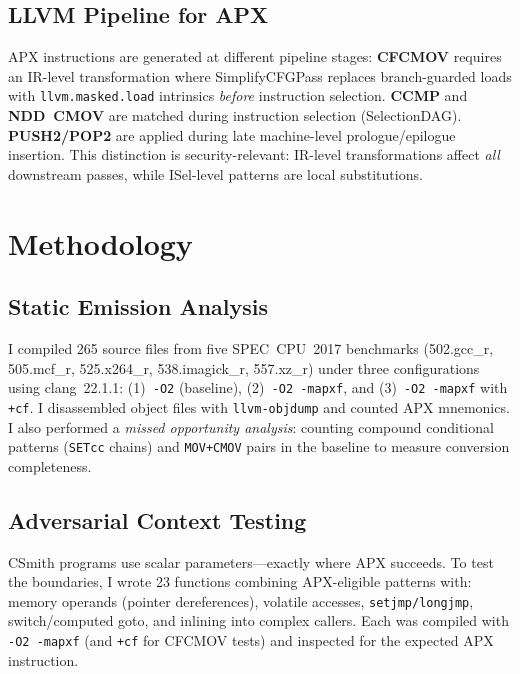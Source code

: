 \documentclass[acmsmall,nonacm]{acmart}
\begin{document}
\subsection{LLVM Pipeline for APX}

APX instructions are generated at different pipeline stages:
\textbf{CFCMOV} requires an IR-level transformation where
SimplifyCFGPass replaces branch-guarded loads with
\texttt{llvm.masked.load} intrinsics \emph{before} instruction
selection. \textbf{CCMP} and \textbf{NDD~CMOV} are matched during
instruction selection (SelectionDAG). \textbf{PUSH2/POP2} are applied
during late machine-level prologue/epilogue insertion. This
distinction is security-relevant: IR-level transformations affect
\emph{all} downstream passes, while ISel-level patterns are local
substitutions.


\section{Methodology}

\subsection{Static Emission Analysis}

I compiled 265 source files from five SPEC~CPU~2017 benchmarks
(502.gcc\_r, 505.mcf\_r, 525.x264\_r, 538.imagick\_r, 557.xz\_r)
under three configurations using clang~22.1.1: (1)~\texttt{-O2}
(baseline), (2)~\texttt{-O2 -mapxf}, and (3)~\texttt{-O2 -mapxf}
with \texttt{+cf}. I disassembled object files with
\texttt{llvm-objdump} and counted APX mnemonics. I also performed a
\emph{missed opportunity analysis}: counting compound conditional
patterns (\texttt{SETcc} chains) and \texttt{MOV+CMOV} pairs in the
baseline to measure conversion completeness.

\subsection{Adversarial Context Testing}

CSmith programs use scalar parameters---exactly where APX succeeds.
To test the boundaries, I wrote 23 functions combining APX-eligible
patterns with: memory operands (pointer dereferences), volatile
accesses, \texttt{setjmp/longjmp}, switch/computed goto, and inlining
into complex callers. Each was compiled with \texttt{-O2 -mapxf} (and
\texttt{+cf} for CFCMOV tests) and inspected for the expected APX
instruction.
\end{document}
